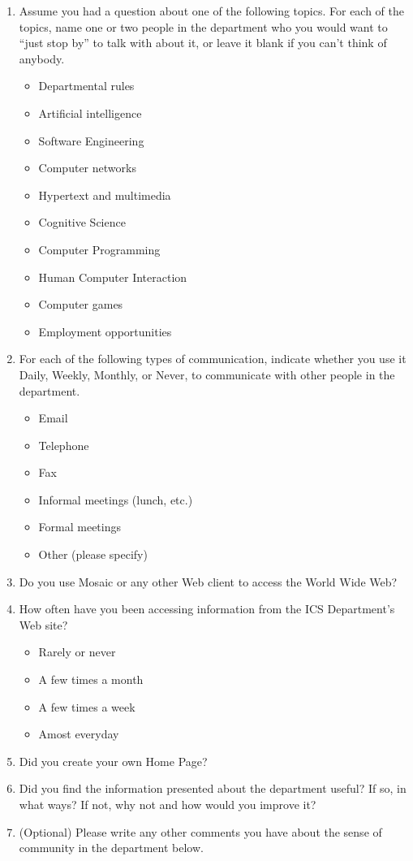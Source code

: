 \begin{enumerate}
\item{Assume you had a question about one of the following topics.  For
  each of the topics, name one or two people in the department who you
  would want to ``just stop by'' to talk with about it, or leave it blank
  if you can't think of anybody.}

  \begin{itemize}
  \item{Departmental rules}
  \item{Artificial intelligence}
  \item{Software Engineering}
  \item{Computer networks}
  \item{Hypertext and multimedia}
  \item{Cognitive Science}
  \item{Computer Programming}
  \item{Human Computer Interaction}
  \item{Computer games}
  \item{Employment opportunities}
  \end{itemize}

\item{For each of the following types of communication, indicate whether
  you use it Daily, Weekly, Monthly, or Never, to communicate with other
  people in the department.}
  \begin{itemize}
  \item{Email}
  \item{Telephone}
  \item{Fax}
  \item{Informal meetings (lunch, etc.)}
  \item{Formal meetings}
  \item{Other (please specify)}
  \end{itemize}

\item{Do you use Mosaic or any other Web client to access the World Wide
  Web?}

\item{How often have you been accessing information from the ICS
  Department's Web site?}
  \begin{itemize}
  \item{Rarely or never}
  \item{A few times a month}
  \item{A few times a week}
  \item{Amost everyday}
  \end{itemize} 

\item{Did you create your own Home Page?}

\item{Did you find the information presented about the department useful?
  If so, in what ways?  If not, why not and how would you improve it?}

\item{(Optional) Please write any other comments you have about the sense of
  community in the department below.}

\end{enumerate}
